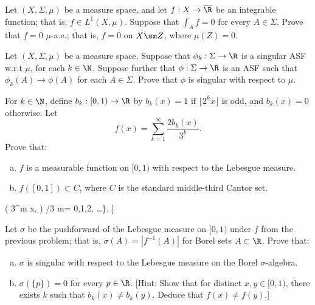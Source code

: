 


\begin{hw} \label{hw:59}
Let $(X,\Sigma,\mu)$ be a measure space, and let $f: X \to \overline{\R}$ be an integrable function; that is, $f \in L^1(X,\mu)$. Suppose that $\int_A f= 0$ for every $A \in \Sigma$. Prove that $f= 0$ $\mu$-a.e.; that is, $f=0$ on $X \sm Z$, where $\mu(Z)=0$. \\
\end{hw}


\begin{hw} \label{hw:60}
Let $(X,\Sigma,\mu)$ be a measure space. Suppose that $\phi_k: \Sigma \to \R$ is a singular ASF w.r.t $\mu$, for each $k \in \N$. Suppose further that $\phi: \Sigma \to \R$ is an ASF such that $\phi_k(A) \to \phi(A)$ for each $A \in \Sigma$. Prove that $\phi$ is singular with respect to $\mu$. \\
\end{hw}


\begin{hw} \label{hw:61}
For $k \in \N$, define $b_k: [0, 1) \to \R$ by $b_k(x)= 1$ if $\lfloor 2^k x\rfloor$ is odd, and $b_k (x)= 0$ otherwise. Let 
        \[
        f(x)= \sum_{k=1}^\infty \frac{2 b_k(x)}{3^k}.
        \]
Prove that: \hfill
        \begin{enumerate}[(a)]
        \item $f$ is a measurable function on $[0,1)$ with respect to the Lebesgue measure. 
        \item $f([0, 1]) \subset C$, where $C$ is the standard middle-third Cantor set. 
        \end{enumerate}
\noindent [Hint: You can use the following characterization of $C$, 
	\[
	C= \{ x \in [0, 1] \colon \dist( 3^m x, \Z) /3  m= 0,1,2,  \ldots \}. ]
	\]
\end{hw}


\begin{hw} \label{hw:62}
Let $\sigma$ be the pushforward of the Lebesgue measure on $[0, 1)$ under $f$ from the previous problem; that is, $\sigma(A)= |f^{-1}(A)|$ for Borel sets $A  \subset \R$. Prove that: \hfill
	\begin{enumerate}[(a)]
	\item $\sigma$ is singular with respect to the Lebesgue measure on the Borel $\sigma$-algebra. 
	\item $\sigma(\{ p \})= 0$ for every $p \in \R$. [Hint: Show that for distinct $x,y \in [0, 1)$, there exists $k$ such that $b_k(x) \neq b_k(y)$. Deduce that $f(x) \neq f(y)$.]
	\end{enumerate}
\end{hw}

